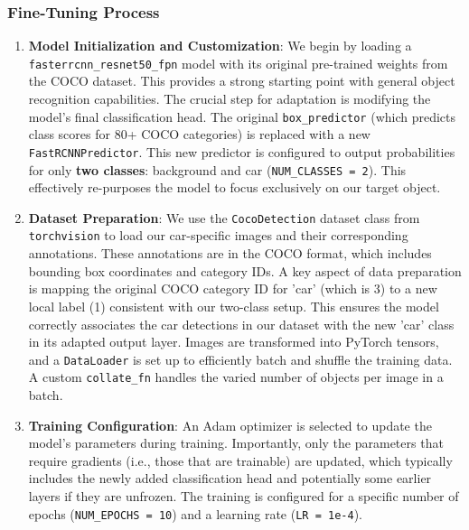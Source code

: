 \documentclass[12pt,a4paper]{article}
\begin{document}
\subsubsection{Fine-Tuning Process}

\begin{enumerate}
    \item \textbf{Model Initialization and Customization}:
    We begin by loading a \texttt{fasterrcnn\_resnet50\_fpn} model with its original pre-trained weights from the COCO dataset. This provides a strong starting point with general object recognition capabilities. The crucial step for adaptation is modifying the model's final classification head. The original \texttt{box\_predictor} (which predicts class scores for 80+ COCO categories) is replaced with a new \texttt{FastRCNNPredictor}. This new predictor is configured to output probabilities for only \textbf{two classes}: background and car (\texttt{NUM\_CLASSES = 2}). This effectively re-purposes the model to focus exclusively on our target object.

    \item \textbf{Dataset Preparation}:
    We use the \texttt{CocoDetection} dataset class from \texttt{torchvision} to load our car-specific images and their corresponding annotations. These annotations are in the COCO format, which includes bounding box coordinates and category IDs. A key aspect of data preparation is mapping the original COCO category ID for 'car' (which is 3) to a new local label (1) consistent with our two-class setup. This ensures the model correctly associates the car detections in our dataset with the new 'car' class in its adapted output layer. Images are transformed into PyTorch tensors, and a \texttt{DataLoader} is set up to efficiently batch and shuffle the training data. A custom \texttt{collate\_fn} handles the varied number of objects per image in a batch.

    \item \textbf{Training Configuration}:
    An Adam optimizer is selected to update the model's parameters during training. Importantly, only the parameters that require gradients (i.e., those that are trainable) are updated, which typically includes the newly added classification head and potentially some earlier layers if they are unfrozen. The training is configured for a specific number of epochs (\texttt{NUM\_EPOCHS = 10}) and a learning rate (\texttt{LR = 1e-4}).


\end{enumerate}
\end{document}
